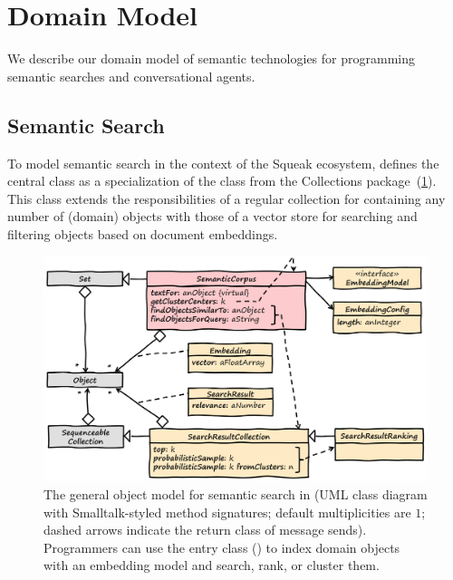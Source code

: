 
\section{Domain Model}
\label{sec:semtex/model}

We describe our domain model of semantic technologies for programming semantic searches and conversational agents.

\subsection*{Semantic Search}
\label{sec:semtex/model/search}

To model semantic search in the context of the Squeak ecosystem, \semtex defines the central class  as a specialization of the  class from the Collections package~(\cref{fig:semtex/model/search}).
This class extends the responsibilities of a regular collection for containing any number of (domain) objects with those of a vector store for searching and filtering objects based on document embeddings.

\begin{figure}
	\centering
	\includegraphics[width=\textwidth]{01_model/search.png}
	\caption[The general object model for semantic search in \semtex.]{
		The general object model for semantic search in \semtex (UML class diagram with Smalltalk-styled method signatures; default multiplicities are $1$; dashed arrows indicate the return class of message sends).
		Programmers can use the entry class  (\bold{\textcolor{red}{red}}) to index domain objects with an embedding model and search, rank, or cluster them.
	}
	\label{fig:semtex/model/search}
\end{figure}

